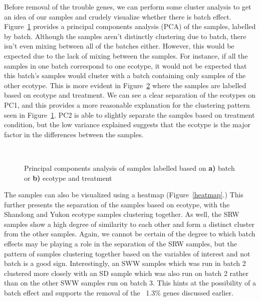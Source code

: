 \documentclass[12pt]{article}
\begin{document}
	Before removal of the trouble genes, we can perform some cluster analysis to get an idea of our samples and crudely visualize whether there is batch effect. Figure~\ref{pca_batch} provides a principal components analysis (PCA) of the samples, labelled by batch. Although the samples aren't distinctly clustering due to batch, there isn't even mixing between all of the batches either. However, this would be expected due to the lack of mixing between the samples. For instance, if all the samples in one batch correspond to one ecotype, it would not be expected that this batch's samples would cluster with a batch containing only samples of the other ecotype. This is more evident in Figure~\ref{pca_data} where the samples are labelled based on ecotype and treatment. We can see a clear separation of the ecotypes on PC1, and this provides a more reasonable explanation for the clustering pattern seen in Figure~\ref{pca_batch}. PC2 is able to slightly separate the samples based on treatment condition, but the low variance explained suggests that the ecotype is the major factor in the differences between the samples. 


\begin{figure}
	\centering
	\begin{subfigure}[b]{1\textwidth}
		\centering
			\scalebox{0.5}{}
		\caption{}
		\label{pca_batch}
	\end{subfigure}
	~ %
	\begin{subfigure}[b]{1\textwidth}
		\centering
			\scalebox{0.5}{}
		\caption{}
		\label{pca_data}
	\end{subfigure}
	\caption[Cluster analysis with PCA]{Principal components analysis of samples labelled based on \textbf{a)} batch or \textbf{b)} ecotype and treatment}
	\label{pca}
\end{figure}
		
	The samples can also be visualized using a heatmap (Figure~\ref{heatmap}.)	This further presents the separation of the samples based on ecotype, with the Shandong and Yukon ecotype samples clustering together. As well, the SRW samples show a high degree of similarity to each other and form a distinct cluster from the other samples. Again, we cannot be certain of the degree to which batch effects may be playing a role in the separation of the SRW samples, but the pattern of samples clustering together based on the variables of interest and not batch is a good sign. Interestingly, an SWW samples which was run in batch 2 clustered more closely with an SD sample which was also run on batch 2 rather than on the other SWW samples run on batch 3. This hints at the possibility of a batch effect and supports the removal of the ~1.3\% genes discussed earlier.
		
\end{document}
